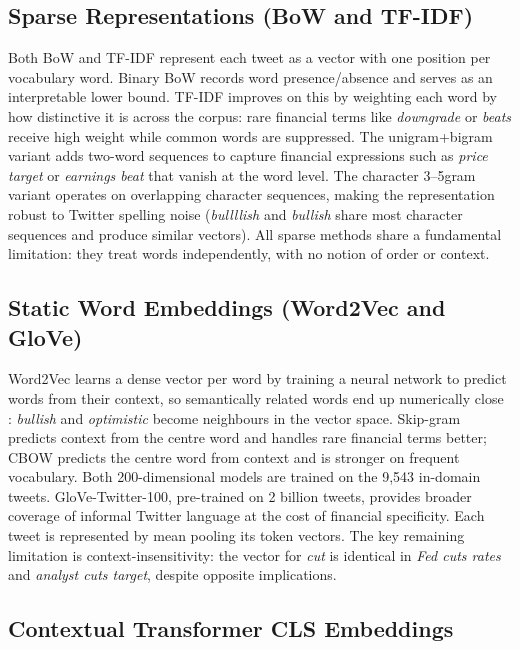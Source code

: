 \documentclass[11pt,a4paper]{article}
\begin{document}
\subsection{Sparse Representations (BoW and TF-IDF)}

Both BoW and TF-IDF represent each tweet as a vector with one position per vocabulary word.
Binary BoW records word presence/absence and serves as an interpretable lower bound.
TF-IDF improves on this by weighting each word by how distinctive it is across the corpus:
rare financial terms like \textit{downgrade} or \textit{beats} receive high weight while common
words are suppressed. The unigram+bigram variant adds two-word sequences to capture financial
expressions such as \textit{price target} or \textit{earnings beat} that vanish at the word
level. The character 3–5gram variant operates on overlapping character sequences, making the
representation robust to Twitter spelling noise (\textit{bullllish} and \textit{bullish} share
most character sequences and produce similar vectors). All sparse methods share a fundamental
limitation: they treat words independently, with no notion of order or context.

\subsection{Static Word Embeddings (Word2Vec and GloVe)}

Word2Vec learns a dense vector per word by training a neural network to predict words from
their context, so semantically related words end up numerically close : \textit{bullish} and
\textit{optimistic} become neighbours in the vector space. Skip-gram predicts context from the
centre word and handles rare financial terms better; CBOW predicts the centre word from context
and is stronger on frequent vocabulary. Both 200-dimensional models are trained on the 9,543
in-domain tweets. GloVe-Twitter-100, pre-trained on 2 billion tweets,
provides broader coverage of informal Twitter language at the cost of financial specificity.
Each tweet is represented by mean pooling its token vectors. The key remaining limitation is
context-insensitivity: the vector for \textit{cut} is identical in \textit{Fed cuts rates} and
\textit{analyst cuts target}, despite opposite implications.

\subsection{Contextual Transformer CLS Embeddings}
\end{document}
